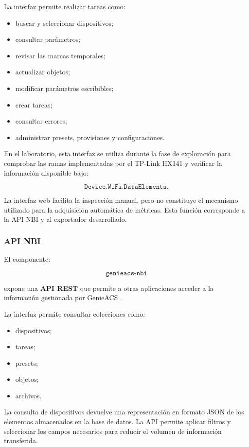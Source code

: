 La interfaz permite realizar tareas como:

\begin{itemize}
    \item buscar y seleccionar dispositivos;
    \item consultar parámetros;
    \item revisar las marcas temporales;
    \item actualizar objetos;
    \item modificar parámetros escribibles;
    \item crear tareas;
    \item consultar errores;
    \item administrar presets, provisiones y configuraciones.
\end{itemize}

En el laboratorio, esta interfaz se utiliza durante la fase de
exploración para comprobar las ramas implementadas por el TP-Link HX141 y
verificar la información disponible bajo:

\[
    \texttt{Device.WiFi.DataElements.}
\]

La interfaz web facilita la inspección manual, pero no constituye el
mecanismo utilizado para la adquisición automática de métricas. Esta
función corresponde a la API NBI y al exportador desarrollado.


\subsubsection*{API NBI}

El componente:

\[
    \texttt{genieacs-nbi}
\]

expone una \textbf{API REST} que permite a otras aplicaciones acceder a
la información gestionada por GenieACS
\cite{genieacs_api}.

La interfaz permite consultar colecciones como:

\begin{itemize}
    \item dispositivos;
    \item tareas;
    \item presets;
    \item objetos;
    \item archivos.
\end{itemize}

La consulta de dispositivos devuelve una representación en formato JSON
de los elementos almacenados en la base de datos. La API permite aplicar
filtros y seleccionar los campos necesarios para reducir el volumen de
información transferida.

